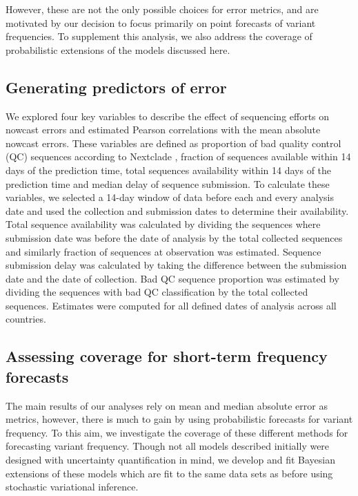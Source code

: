 However, these are not the only possible choices for error metrics, and are motivated by our decision to focus primarily on point forecasts of variant frequencies.
To supplement this analysis, we also address the coverage of probabilistic extensions of the models discussed here.

\subsection*{Generating predictors of error}

We explored four key variables to describe the effect of sequencing efforts on nowcast errors and estimated Pearson correlations with the mean absolute nowcast errors.
These variables are defined as proportion of bad quality control (QC) sequences according to Nextclade \cite{aksamentov2021nextclade}, fraction of sequences available within 14 days of the prediction time, total sequences availability within 14 days of the prediction time and median delay of sequence submission.
To calculate these variables, we selected a 14-day window of data before each and every analysis date and used the collection and submission dates to determine their availability.
Total sequence availability was calculated by dividing the sequences where submission date was before the date of analysis by the total collected sequences and similarly fraction of sequences at observation was estimated.
Sequence submission delay was calculated by taking the difference between the submission date and the date of collection.
Bad QC sequence proportion was estimated by dividing the sequences with bad QC classification by the total collected sequences.
Estimates were computed for all defined dates of analysis across all countries.

\subsection*{Assessing coverage for short-term frequency forecasts}

The main results of our analyses rely on mean and median absolute error as metrics, however, there is much to gain by using probabilistic forecasts for variant frequency.
To this aim, we investigate the coverage of these different methods for forecasting variant frequency.
Though not all models described initially were designed with uncertainty quantification in mind, we develop and fit Bayesian extensions of these models which are fit to the same data sets as before using stochastic variational inference.


